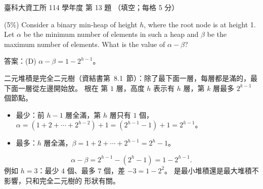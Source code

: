 \begin{pastexam}[label={px:ntust-114-ice-13}]{臺科大資工所 114 學年度 第 13 題}
（填空；每格 5 分）

(5\%) Consider a binary min-heap of height $h$, where the root node is at height 1. Let $\alpha$ be
the minimum number of elements in such a heap and $\beta$ be the maximum number of elements. What
is the value of $\alpha-\beta$? 
\end{pastexam}

\begin{pastsoln}
答案：(D) $\alpha - \beta = 1 - 2^{h-1}$。

二元堆積是完全二元樹（資結書第~8.1~節）：除了最下面一層，每層都是滿的，最下面一層從左邊開始放。 根在
第 $1$ 層，高度 $h$ 表示有 $h$ 層，第 $k$ 層最多 $2^{k-1}$ 個節點。
\begin{itemize}
\item 最少：前 $h - 1$ 層全滿，第 $h$ 層只有 $1$ 個，
$\alpha = (1 + 2 + \cdots + 2^{h-2}) + 1 = (2^{h-1} - 1) + 1 = 2^{h-1}$。
\item 最多：$h$ 層全滿，$\beta = 1 + 2 + \cdots + 2^{h-1} = 2^h - 1$。
\end{itemize}
\[
\alpha - \beta = 2^{h-1} - (2^h - 1) = 1 - 2^{h-1}.
\]
例如 $h = 3$：最少 $4$ 個、最多 $7$ 個，差 $-3 = 1 - 2^2$。 是最小堆積還是最大堆積不影響，只和完全二元樹的
形狀有關。
\end{pastsoln}

